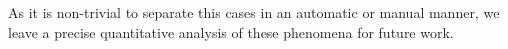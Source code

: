 As it is non-trivial to separate this cases in an automatic or manual manner, we leave a precise quantitative analysis of these phenomena for future work.





